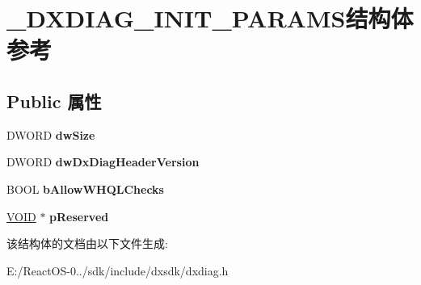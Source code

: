 \hypertarget{struct___d_x_d_i_a_g___i_n_i_t___p_a_r_a_m_s}{}\section{\+\_\+\+D\+X\+D\+I\+A\+G\+\_\+\+I\+N\+I\+T\+\_\+\+P\+A\+R\+A\+M\+S结构体 参考}
\label{struct___d_x_d_i_a_g___i_n_i_t___p_a_r_a_m_s}
\subsection*{Public 属性}
\begin{DoxyCompactItemize}
\item 
\mbox{\label{struct___d_x_d_i_a_g___i_n_i_t___p_a_r_a_m_s_a64d6102ce4a05d9c154b55c6164ffebf}} 
D\+W\+O\+RD {\bfseries dw\+Size}
\item 
\mbox{\label{struct___d_x_d_i_a_g___i_n_i_t___p_a_r_a_m_s_a46e7d71c9451ab962f401177af5f6d7f}} 
D\+W\+O\+RD {\bfseries dw\+Dx\+Diag\+Header\+Version}
\item 
\mbox{\label{struct___d_x_d_i_a_g___i_n_i_t___p_a_r_a_m_s_a92bacab799ee8443d6d92782536f0691}} 
B\+O\+OL {\bfseries b\+Allow\+W\+H\+Q\+L\+Checks}
\item 
\mbox{\label{struct___d_x_d_i_a_g___i_n_i_t___p_a_r_a_m_s_a54f4d1ba4e9874cae3a34bd8c003fd03}} 
\hyperlink{interfacevoid}{V\+O\+ID} $\ast$ {\bfseries p\+Reserved}
\end{DoxyCompactItemize}


该结构体的文档由以下文件生成\+:\begin{DoxyCompactItemize}
\item 
E\+:/\+React\+O\+S-\/0../sdk/include/dxsdk/dxdiag.\+h\end{DoxyCompactItemize}
